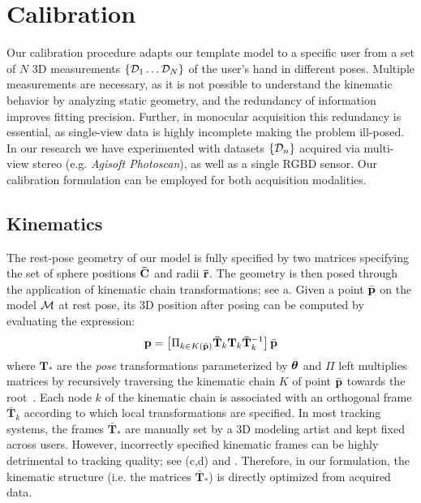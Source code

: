 
\section{Calibration}
\label{sec:modeling}

Our calibration procedure adapts our template model to a specific user from a set of $N$ 3D measurements $\{ \mathcal{D}_1 \dots \mathcal{D}_N \}$ of the user's hand in different poses. Multiple measurements are necessary, as it is not possible to understand the kinematic behavior by analyzing static geometry, and the redundancy of information improves fitting precision. Further, in  monocular acquisition this redundancy is essential, as single-view data is highly incomplete\todo{,} making the problem ill-posed. In our research we have experimented with datasets $\{\mathcal{D}_n\}$ acquired via multi-view stereo (e.g. \emph{Agisoft Photoscan}), as well as a single RGBD sensor. 
Our calibration formulation can be employed for both acquisition modalities.

\subsection*{Kinematics}
The rest-pose geometry of our model is fully specified by two matrices specifying the set of sphere positions ${\mathbf{\bar{C}}}$ and  radii ${\mathbf{\bar{r}}}$. The geometry is then posed through the application of  kinematic chain transformations; see a. Given a point $\bar{\mathbf{p}}$ on the model $\mathcal{M}$ at rest pose, its 3D position after posing can be computed by evaluating the expression:
% 
\begin{equation}
\mathbf{p} = \left[ \Pi_{k \in K(\bar{\mathbf{p}})} \mathbf{\bar{T}}_k \mathbf{T}_k \mathbf{\bar{T}}_k^{-1} \right] \bar{\mathbf{p}}
\label{eq:kinematic}
\end{equation}
%
where $\mathbf{T}_*$ are the \emph{pose} transformations parameterized by $\boldsymbol{\theta}$ and $\Pi$ left multiplies matrices by recursively traversing the kinematic chain $K$ of point $\bar{\mathbf{p}}$ towards the root~\cite{buss2004introduction}. 
Each node $k$ of the kinematic chain is associated with an orthogonal frame $\mathbf{\bar{T}}_k$ according to which local transformations are specified. In most tracking systems, the frames $\mathbf{\bar{T}}_*$ are manually set by a 3D modeling artist and kept fixed across users. However, incorrectly specified kinematic frames can be highly detrimental to tracking quality; see (c,d) and \VideoKinematic{}. Therefore, in our formulation, the kinematic structure (i.e. the matrices $\mathbf{\bar{T}}_*$) is directly optimized from acquired data.

